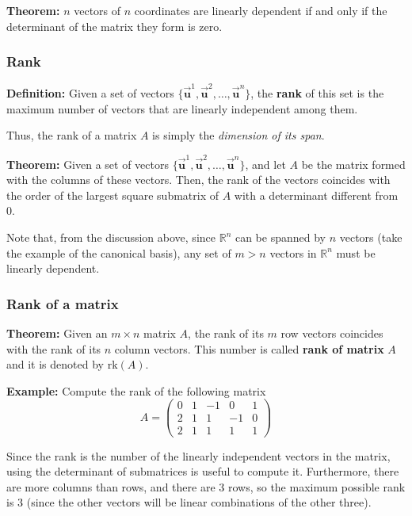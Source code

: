 \documentclass[11pt]{article}
\begin{document}
\textbf{Theorem:} \(n\) vectors of \(n\) coordinates are linearly
dependent if and only if the determinant of the matrix they form is
zero.

\hypertarget{rank}{%
\subsubsection{Rank}\label{rank}}

\textbf{Definition:} Given a set of vectors
\(\{\vec{\mathbf{u}}^1,\vec{\mathbf{u}}^2,\ldots,\vec{\mathbf{u}}^n\}\),
the \textbf{rank} of this set is the maximum number of vectors that are
linearly independent among them.

Thus, the rank of a matrix \(A\) is simply the \emph{dimension of its
span}.

\textbf{Theorem:} Given a set of vectors
\(\{\vec{\mathbf{u}}^1,\vec{\mathbf{u}}^2,\ldots,\vec{\mathbf{u}}^n\}\),
and let \(A\) be the matrix formed with the columns of these vectors.
Then, the rank of the vectors coincides with the order of the largest
square submatrix of \(A\) with a determinant different from \(0\).

Note that, from the discussion above, since \(\mathbb{R}^n\) can be
spanned by \(n\) vectors (take the example of the canonical basis), any
set of \(m > n\) vectors in \(\mathbb{R}^n\) must be linearly dependent.

\hypertarget{rank-of-a-matrix}{%
\subsubsection{Rank of a matrix}\label{rank-of-a-matrix}}

\textbf{Theorem:} Given an \(m\times n\) matrix \(A\), the rank of its
\(m\) row vectors coincides with the rank of its \(n\) column vectors.
This number is called \textbf{rank of matrix} \(A\) and it is denoted by
\(\text{rk}(A)\).

\textbf{Example:} Compute the rank of the following matrix \[
A = \begin{pmatrix} 0 & 1 & -1 & 0 & 1 \\ 2 & 1 & 1 & -1 & 0 \\ 2 & 1 & 1 & 1 & 1 \end{pmatrix}
\]

Since the rank is the number of the linearly independent vectors in the
matrix, using the determinant of submatrices is useful to compute it.
Furthermore, there are more columns than rows, and there are \(3\) rows,
so the maximum possible rank is \(3\) (since the other vectors will be
linear combinations of the other three).
\end{document}
